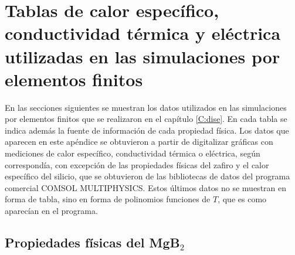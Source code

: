 \chapter{Tablas de calor específico, conductividad térmica y eléctrica utilizadas en las simulaciones por elementos finitos}\label{C:tablas}
\graphicspath{{figs/Apendice}}
En las secciones siguientes se muestran los datos utilizados en las simulaciones por elementos finitos que se realizaron en el capítulo \ref{C:dise}. En cada tabla se indica además la fuente de información de cada propiedad física. Los datos que aparecen en este apéndice se obtuvieron a partir de digitalizar gráficas con mediciones de calor específico, conductividad térmica o eléctrica, según correspondía, con excepción de las propiedades físicas del zafiro y el calor específico del silicio, que se obtuvieron de las bibliotecas de datos del programa comercial COMSOL MULTIPHYSICS. Estos últimos datos no se muestran en forma de tabla, sino en forma de polinomios funciones de $T$, que es como aparecían en el programa.
\newpage
\section{Propiedades físicas del MgB$_2$}
